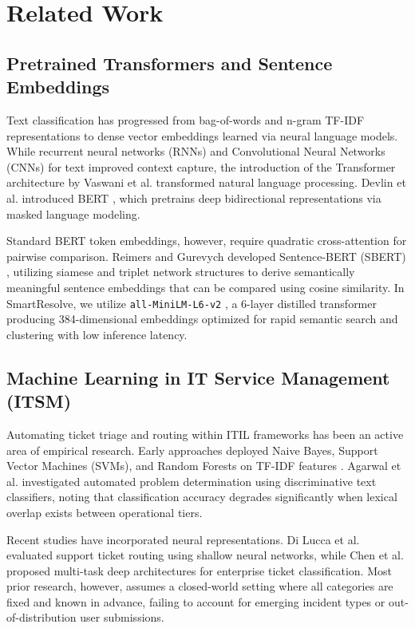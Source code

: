 \documentclass[conference]{IEEEtran}
\begin{document}
\section{Related Work}

\subsection{Pretrained Transformers and Sentence Embeddings}
Text classification has progressed from bag-of-words and n-gram TF-IDF representations \cite{salton1988} to dense vector embeddings learned via neural language models. While recurrent neural networks (RNNs) and Convolutional Neural Networks (CNNs) for text \cite{kim2014} improved context capture, the introduction of the Transformer architecture by Vaswani et al. \cite{vaswani2017} transformed natural language processing. Devlin et al. introduced BERT \cite{devlin2019}, which pretrains deep bidirectional representations via masked language modeling.

Standard BERT token embeddings, however, require quadratic cross-attention for pairwise comparison. Reimers and Gurevych developed Sentence-BERT (SBERT) \cite{reimers2019}, utilizing siamese and triplet network structures to derive semantically meaningful sentence embeddings that can be compared using cosine similarity. In SmartResolve, we utilize \texttt{all-MiniLM-L6-v2} \cite{wang2020}, a 6-layer distilled transformer producing 384-dimensional embeddings optimized for rapid semantic search and clustering with low inference latency.

\subsection{Machine Learning in IT Service Management (ITSM)}
Automating ticket triage and routing within ITIL frameworks has been an active area of empirical research. Early approaches deployed Naive Bayes, Support Vector Machines (SVMs), and Random Forests on TF-IDF features \cite{cortes1995, breiman2001}. Agarwal et al. \cite{agarwal2009} investigated automated problem determination using discriminative text classifiers, noting that classification accuracy degrades significantly when lexical overlap exists between operational tiers.

Recent studies have incorporated neural representations. Di Lucca et al. \cite{dilucca2002} evaluated support ticket routing using shallow neural networks, while Chen et al. \cite{chen2020} proposed multi-task deep architectures for enterprise ticket classification. Most prior research, however, assumes a closed-world setting where all categories are fixed and known in advance, failing to account for emerging incident types or out-of-distribution user submissions.
\end{document}
